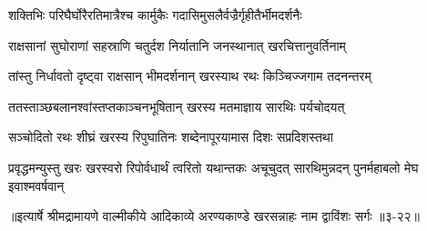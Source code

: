 \twolineshloka
{शक्तिभिः परिघैर्घोरैरतिमात्रैश्च कार्मुकैः}
{गदासिमुसलैर्वज्रैर्गृहीतैर्भीमदर्शनैः} %

\twolineshloka
{राक्षसानां सुघोराणां सहस्राणि चतुर्दश}
{निर्यातानि जनस्थानात् खरचित्तानुवर्तिनाम्} %

\twolineshloka
{तांस्तु निर्धावतो दृष्ट्वा राक्षसान् भीमदर्शनान्}
{खरस्याथ रथः किञ्चिज्जगाम तदनन्तरम्} %

\twolineshloka
{ततस्ताञ्छबलानश्वांस्तप्तकाञ्चनभूषितान्}
{खरस्य मतमाज्ञाय सारथिः पर्यचोदयत्} %

\twolineshloka
{सञ्चोदितो रथः शीघ्रं खरस्य रिपुघातिनः}
{शब्देनापूरयामास दिशः सप्रदिशस्तथा} %

\twolineshloka
{प्रवृद्धमन्युस्तु खरः खरस्वरो रिपोर्वधार्थं त्वरितो यथान्तकः}
{अचूचुदत् सारथिमुन्नदन् पुनर्महाबलो मेघ इवाश्मवर्षवान्} %


॥इत्यार्षे श्रीमद्रामायणे वाल्मीकीये आदिकाव्ये अरण्यकाण्डे खरसन्नाहः नाम द्वाविंशः सर्गः ॥३-२२॥
